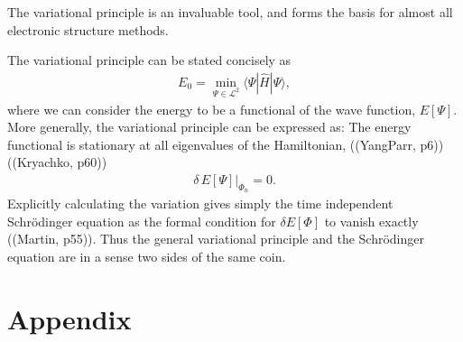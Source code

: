\documentclass[a4paper]{article}
\begin{document}
The variational principle is an invaluable tool, and forms the basis for almost all electronic structure methods. 

The variational principle can be stated concisely as 
\begin{align}
E_0 = \min_{\Psi\in \mathcal{L}^2}\big\langle \Psi | \hat H | \Psi \big\rangle,
\end{align}
where we can consider the energy to be a functional of the wave function, $E[\Psi]$. More generally, the variational principle can be expressed as: The energy functional is stationary at all eigenvalues of the Hamiltonian, ((YangParr, p6)) ((Kryachko, p60))
\begin{align}
\delta \, E[\Psi]\Big|_{\Phi_n}=0.
\end{align}
Explicitly calculating the variation gives simply the time independent Schrödinger equation as the formal condition for $\delta E[\Phi]$ to vanish exactly ((Martin, p55)). Thus the general variational principle and the Schrödinger equation are in a sense two sides of the same coin.






























\section{Appendix}
\end{document}
